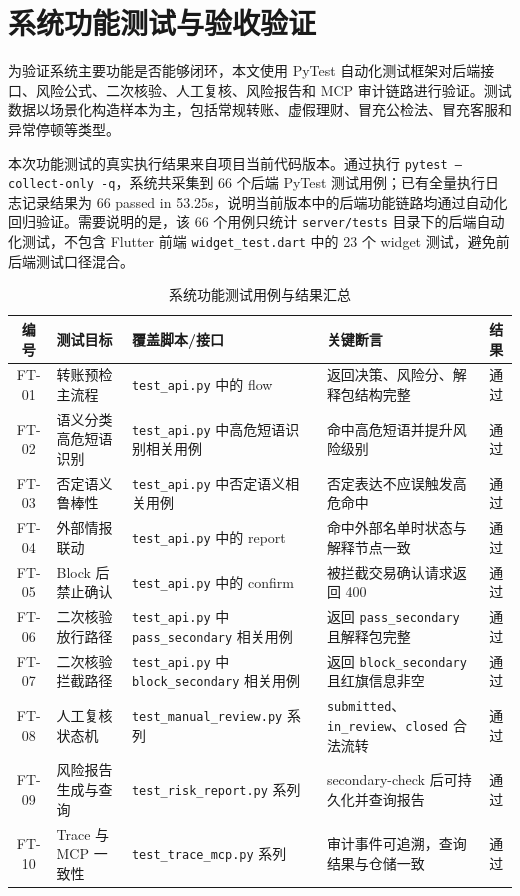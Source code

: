 \documentclass{xduugthesis}
\begin{document}
\section{系统功能测试与验收验证}

为验证系统主要功能是否能够闭环，本文使用 PyTest 自动化测试框架对后端接口、风险公式、二次核验、人工复核、风险报告和 MCP 审计链路进行验证。测试数据以场景化构造样本为主，包括常规转账、虚假理财、冒充公检法、冒充客服和异常停顿等类型。

本次功能测试的真实执行结果来自项目当前代码版本。通过执行 \texttt{pytest --collect-only -q}，系统共采集到 66 个后端 PyTest 测试用例；已有全量执行日志记录结果为 66 passed in 53.25s，说明当前版本中的后端功能链路均通过自动化回归验证。需要说明的是，该 66 个用例只统计 \texttt{server/tests} 目录下的后端自动化测试，不包含 Flutter 前端 \texttt{widget\_test.dart} 中的 23 个 widget 测试，避免前后端测试口径混合。

\begin{table}[H]
    \centering
    \caption{系统功能测试用例与结果汇总}
    \label{tab:func-test-cases}
    \small
    \begin{tabularx}{\linewidth}{|c|Y|Y|Y|c|}
        \hline
        编号 & 测试目标 & 覆盖脚本/接口 & 关键断言 & 结果 \\
        \hline
        FT-01 & 转账预检主流程 & \texttt{test\_api.py} 中的 flow & 返回决策、风险分、解释包结构完整 & 通过 \\
        \hline
        FT-02 & 语义分类高危短语识别 & \texttt{test\_api.py} 中高危短语识别相关用例 & 命中高危短语并提升风险级别 & 通过 \\
        \hline
        FT-03 & 否定语义鲁棒性 & \texttt{test\_api.py} 中否定语义相关用例 & 否定表达不应误触发高危命中 & 通过 \\
        \hline
        FT-04 & 外部情报联动 & \texttt{test\_api.py} 中的 report & 命中外部名单时状态与解释节点一致 & 通过 \\
        \hline
        FT-05 & Block 后禁止确认 & \texttt{test\_api.py} 中的 confirm & 被拦截交易确认请求返回 400 & 通过 \\
        \hline
        FT-06 & 二次核验放行路径 & \texttt{test\_api.py} 中 \texttt{pass\_secondary} 相关用例 & 返回 \texttt{pass\_secondary} 且解释包完整 & 通过 \\
        \hline
        FT-07 & 二次核验拦截路径 & \texttt{test\_api.py} 中 \texttt{block\_secondary} 相关用例 & 返回 \texttt{block\_secondary} 且红旗信息非空 & 通过 \\
        \hline
        FT-08 & 人工复核状态机 & \texttt{test\_manual\_review.py} 系列 & \texttt{submitted}、\texttt{in\_review}、\texttt{closed} 合法流转 & 通过 \\
        \hline
        FT-09 & 风险报告生成与查询 & \texttt{test\_risk\_report.py} 系列 & secondary-check 后可持久化并查询报告 & 通过 \\
        \hline
        FT-10 & Trace 与 MCP 一致性 & \texttt{test\_trace\_mcp.py} 系列 & 审计事件可追溯，查询结果与仓储一致 & 通过 \\
        \hline
    \end{tabularx}
\end{table}
\end{document}
